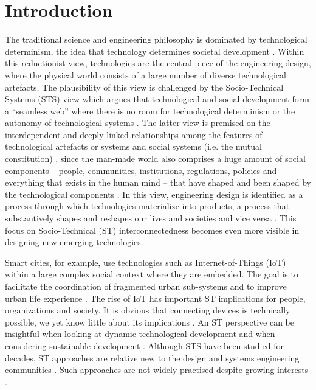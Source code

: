 \section{Introduction}
\label{sec:intro}

The traditional science and engineering philosophy is dominated by technological determinism, the idea that technology determines societal development \cite{Mody2006,Sawyer2014,Smith1994}. Within this reductionist view, technologies are the central piece of the engineering design, where the physical world consists of a large number of diverse technological artefacts. 
The plausibility of this view is challenged by the Socio-Technical Systems (STS) view \cite{VanDam2012} which argues that technological and social development form a ``seamless web'' where there is no room for technological determinism or the autonomy of technological systems \cite{Fleischhacker2004}. 
%
The latter view is premised on the interdependent and deeply linked relationships among the features of technological artefacts or systems and social systems (i.e. the mutual constitution) \cite{Sawyer2014}, since the man-made world also comprises a huge amount of social components -- people, communities, institutions, regulations, policies and everything that exists in the human mind -- that have shaped and been shaped by the technological components \cite{Harari2014,VanDam2012}. 
In this view, engineering design is identified as a process through which technologies materialize into products, a process that substantively  shapes  and  reshapes  our  lives  and   societies and vice versa \cite{Kroes2008}. This focus on Socio-Technical (ST) interconnectedness becomes even  more  visible in designing new emerging technologies \cite{Kroes2008}.  

Smart cities, for example, use technologies such as Internet-of-Things (IoT) within a large complex social context where they are embedded. The goal is to facilitate the coordination of fragmented urban sub-systems and to improve urban  life experience \cite{Glasmeier2015}. 
% 
The rise of IoT has important ST implications for people, organizations and society. It is obvious that connecting devices is technically possible, we yet know little about its implications \cite{Shin2014}. An ST perspective can be insightful when looking at dynamic technological development and when considering sustainable development \cite{Shin2014}. Although STS have been studied for decades, ST approaches are relative new to the design and systems engineering communities \cite{Baxter2011,Norman2015,Sawyer2014}. Such approaches are not widely practised despite growing interests \cite{Baxter2011}. %

